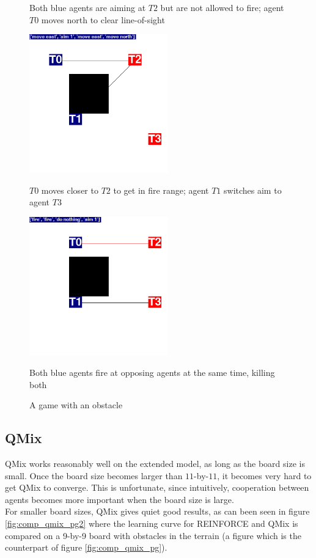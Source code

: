 \begin{figure}
\begin{minipage}{.45\textwidth}
  \caption*{Both blue agents are aiming at $T2$ but are not allowed to fire; agent $T0$ moves north to clear line-of-sight}
\end{minipage}%
\begin{minipage}{.1\textwidth}
\centering
  \caption*{ }
\end{minipage}%
\begin{minipage}{.45\textwidth}
  \centering
  \includegraphics[width=6cm]{images/iteration/screenshot04.png}
    \caption*{$T0$ moves closer to $T2$ to get in fire range; agent $T1$ switches aim to agent $T3$}
\end{minipage}
\begin{minipage}{.5\textwidth}
  \centering
  \includegraphics[width=6cm]{images/iteration/screenshot05.png}
    \caption*{Both blue agents fire at opposing agents at the same time, killing both}
\end{minipage}%
\begin{minipage}{.5\textwidth}
  \centering
\end{minipage}
\caption{A game with an obstacle}
\label{fig:simple_tactic02}
\end{figure}

\subsection{QMix}
QMix works reasonably well on the extended model, as long as the board size is small. Once the board size becomes larger than $11$-by-$11$, it becomes very hard to get QMix to converge. This is unfortunate, since intuitively, cooperation between agents becomes more important when the board size is large.\\
For smaller board sizes, QMix gives quiet good results, as can been seen in figure \ref{fig:comp_qmix_pg2} where the learning curve for REINFORCE and QMix is compared on a 9-by-9 board with obstacles in the terrain (a figure which is the counterpart of figure \ref{fig:comp_qmix_pg}).

